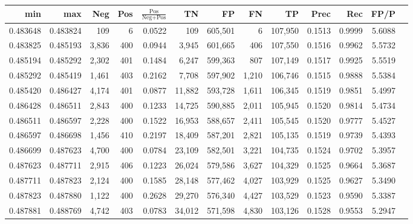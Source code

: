 \begin{tabular}{rrrrrrrrrrrrr}
\toprule
     min &      max &   Neg & Pos & $\frac{\text{Pos}}{\text{Neg}+\text{Pos}}$ &      TN &      FP &      FN &      TP &   Prec &    Rec &   FP/P \\
\midrule
0.483648 & 0.483824 &   109 &   6 &                                     0.0522 &     109 & 605,501 &       6 & 107,950 & 0.1513 & 0.9999 & 5.6088 \\
0.483825 & 0.485193 & 3,836 & 400 &                                     0.0944 &   3,945 & 601,665 &     406 & 107,550 & 0.1516 & 0.9962 & 5.5732 \\
0.485194 & 0.485292 & 2,302 & 401 &                                     0.1484 &   6,247 & 599,363 &     807 & 107,149 & 0.1517 & 0.9925 & 5.5519 \\
0.485292 & 0.485419 & 1,461 & 403 &                                     0.2162 &   7,708 & 597,902 &   1,210 & 106,746 & 0.1515 & 0.9888 & 5.5384 \\
0.485420 & 0.486427 & 4,174 & 401 &                                     0.0877 &  11,882 & 593,728 &   1,611 & 106,345 & 0.1519 & 0.9851 & 5.4997 \\
0.486428 & 0.486511 & 2,843 & 400 &                                     0.1233 &  14,725 & 590,885 &   2,011 & 105,945 & 0.1520 & 0.9814 & 5.4734 \\
0.486511 & 0.486597 & 2,228 & 400 &                                     0.1522 &  16,953 & 588,657 &   2,411 & 105,545 & 0.1520 & 0.9777 & 5.4527 \\
0.486597 & 0.486698 & 1,456 & 410 &                                     0.2197 &  18,409 & 587,201 &   2,821 & 105,135 & 0.1519 & 0.9739 & 5.4393 \\
0.486699 & 0.487623 & 4,700 & 400 &                                     0.0784 &  23,109 & 582,501 &   3,221 & 104,735 & 0.1524 & 0.9702 & 5.3957 \\
0.487623 & 0.487711 & 2,915 & 406 &                                     0.1223 &  26,024 & 579,586 &   3,627 & 104,329 & 0.1525 & 0.9664 & 5.3687 \\
0.487711 & 0.487823 & 2,124 & 400 &                                     0.1585 &  28,148 & 577,462 &   4,027 & 103,929 & 0.1525 & 0.9627 & 5.3490 \\
0.487823 & 0.487880 & 1,122 & 400 &                                     0.2628 &  29,270 & 576,340 &   4,427 & 103,529 & 0.1523 & 0.9590 & 5.3387 \\
0.487881 & 0.488769 & 4,742 & 403 &                                     0.0783 &  34,012 & 571,598 &   4,830 & 103,126 & 0.1528 & 0.9553 & 5.2947 \\

\end{tabular}
